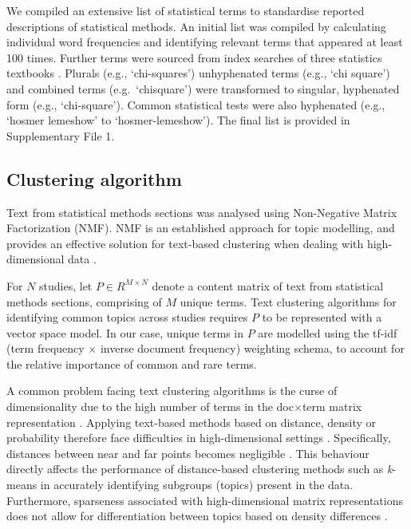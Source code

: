 \documentclass[12pt]{article}
\begin{document}
We compiled an extensive list of statistical terms to standardise
reported descriptions of statistical methods. An initial list was
compiled by calculating individual word frequencies and identifying
relevant terms that appeared at least 100 times. Further terms were
sourced from index searches of three statistics textbooks
\citep{Diggle2013,Bland2015,Dobson2018}. Plurals (e.g.,
`chi-squares') unhyphenated terms (e.g., `chi square') and combined terms
(e.g.~`chisquare') were transformed to singular, hyphenated form
(e.g., `chi-square'). Common statistical tests were also hyphenated
(e.g., `hosmer lemeshow' to `hosmer-lemeshow'). The final list is
provided in Supplementary File 1.

\subsection{Clustering algorithm}

Text from statistical methods sections was analysed using Non-Negative
Matrix Factorization (NMF). NMF is an established approach for topic
modelling, and provides an effective solution for text-based clustering
when dealing with high-dimensional data
\citep[\citet{luong2019clustering}]{kim2014algorithms}.

For \(N\) studies, let \(P \in R^{M \times N}\) denote a content matrix of text from statistical methods sections, comprising of \(M\) unique
terms. Text clustering algorithms for identifying common topics across
studies requires \(P\) to be represented with a vector space model. In
our case, unique terms in \(P\) are modelled using the tf-idf (term
frequency \(\times\) inverse document frequency) weighting schema, to
account for the relative importance of common and rare terms.

A common problem facing text clustering algorithms is the curse of
dimensionality due to the high number of terms in the doc\(\times\)term
matrix representation
\citep[\citet{sutanto2018fine}]{aggarwal2012mining}. Applying text-based
methods based on distance, density or probability therefore face
difficulties in high-dimensional settings
\citep[\citet{mohotti2018corpus},\citet{mohotti2019concept}]{park2018examining}.
Specifically, distances between near and far points becomes negligible
\citep{aggarwal2012mining}. This behaviour directly affects the
performance of distance-based clustering methods such as
\textit{k}-means \citep{jain2010} in accurately identifying subgroups
(topics) present in the data. Furthermore, sparseness associated with
high-dimensional matrix representations does not allow for
differentiation between topics based on density differences
\citep[\citet{mohotti2018efficient}]{mohotti2018corpus}.
\end{document}

